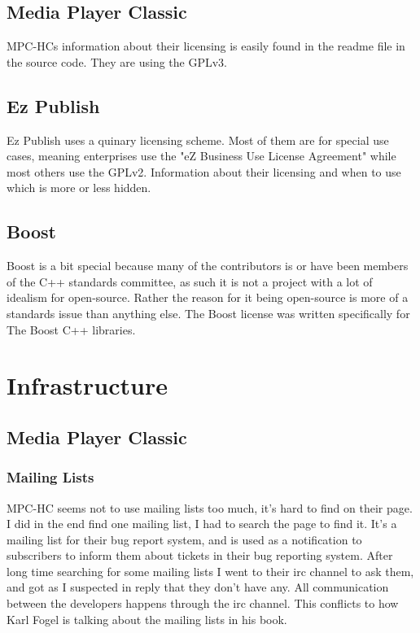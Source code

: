 \documentclass{report} %
\begin{document}
\subsection{Media Player Classic}
MPC-HCs information about their licensing is easily found in the readme file in the source code\cite{mpcsource}. They are using the GPLv3\cite{gplv3}.
\subsection{Ez Publish}
Ez Publish uses a quinary licensing scheme\cite{ezpubweblicenses}. Most of them are for special use cases, meaning enterprises use the "eZ Business Use License Agreement" while most others use the GPLv2\cite{gplv2}. Information about their licensing and when to use which is more or less hidden.
\subsection{Boost}
Boost is a bit special because many of the contributors is or have been members of the C++ standards committee, as such it is not a project with a lot of idealism for open-source. Rather the reason for it being open-source is more of a standards issue than anything else. The Boost license\cite{boostlicense} was written specifically for The Boost C++ libraries.

\section{Infrastructure}
\subsection{Media Player Classic}
\subsubsection{Mailing Lists}
MPC-HC seems not to use mailing lists too much, it's hard to find on their page. I did in the end find one mailing list, I had to search the page to find it. It's a mailing list for their bug report system, and is used as a notification to subscribers to inform them about tickets in their bug reporting system\cite{mpctracsupport}\cite{mpctracmail}. After long time searching for some mailing lists I went to their irc channel to ask them, and got as I suspected in reply that they don't have any. All communication between the developers happens through the irc channel.  This conflicts to how Karl Fogel is talking about the mailing lists in his book\cite{kfposs}. 
\end{document}
